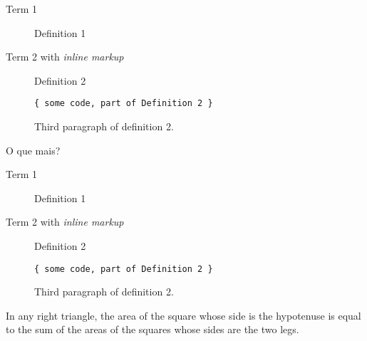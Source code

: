 \documentclass{article}
\begin{document}
\begin{multicols*}{4}
\color{DarkRed}

\begin{description}
\item[Term 1]
Definition 1
\item[Term 2 with \emph{inline markup}]
Definition 2

\begin{verbatim}
{ some code, part of Definition 2 }
\end{verbatim}

Third paragraph of definition 2.
\end{description}



\begin{mdframed}[style=MeuEstilo]

O que mais?

\begin{description}
\item[Term 1]
Definition 1
\item[Term 2 with \emph{inline markup}]
Definition 2

\begin{verbatim}
{ some code, part of Definition 2 }
\end{verbatim}

Third paragraph of definition 2.
\end{description}


In any right triangle, the area of the square whose side is the hypotenuse
is equal to the sum of the areas of the squares whose sides are the two
legs.
\end{mdframed}

\end{multicols*}
\end{document}
